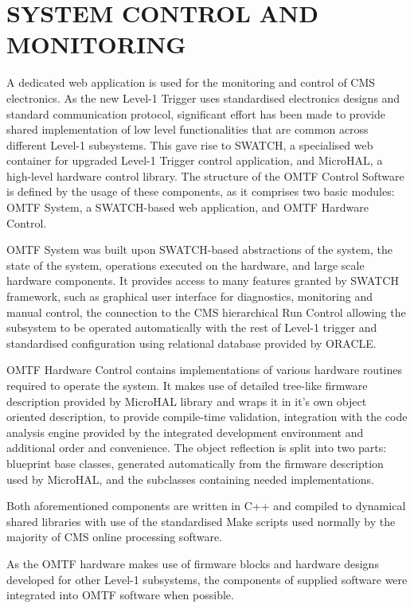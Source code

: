 \section{SYSTEM CONTROL AND MONITORING} 
A dedicated web application is used for the monitoring and control of CMS electronics. As the new Level-1 Trigger uses standardised electronics designs and standard communication protocol, significant effort has been made to provide shared implementation of low level functionalities that are common across different Level-1 subsystems.
This gave rise to SWATCH, a specialised web container for upgraded Level-1 Trigger control application, and MicroHAL, a high-level hardware control library. The structure of the OMTF Control Software is defined by the usage of these components, as it
comprises two basic modules: OMTF System, a SWATCH-based web application, and OMTF Hardware Control.

OMTF System was built upon SWATCH-based abstractions of the system, the state of the system, operations executed on the hardware, and large scale hardware components. It provides access to many features granted by SWATCH framework, such as 
graphical user interface for diagnostics, monitoring and manual control, the connection to the CMS hierarchical Run Control allowing the subsystem to be operated automatically with the rest of Level-1 trigger and standardised configuration using relational 
database provided by ORACLE.

OMTF Hardware Control contains implementations of various hardware routines required to operate the system. It makes use of detailed tree-like firmware description provided by MicroHAL library and wraps it in it's own object oriented description, to provide
compile-time validation, integration with the code analysis engine provided by the integrated development environment and additional order and convenience. The object reflection is split into two parts: blueprint base classes, generated automatically 
from the firmware description used by MicroHAL, and the subclasses containing needed implementations.

Both aforementioned components are written in C++ and compiled to dynamical shared libraries with use of the standardised Make scripts used normally by the majority of CMS online processing software.

As the OMTF hardware makes use of firmware blocks and hardware designs developed for other Level-1 subsystems, the components of supplied software were integrated into OMTF software when possible. 
